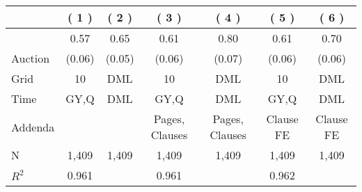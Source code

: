
\begin{tabular}{lcccccc}
\toprule
 & ( 1 ) & ( 2 ) & ( 3 ) & ( 4 ) & ( 5 ) & ( 6 )\\
\midrule
 & 0.57 & 0.65 & 0.61 & 0.80 & 0.61 & 0.70\\

\multirow{-2}{*}{\raggedright\arraybackslash Auction} & (0.06) & (0.05) & (0.06) & (0.07) & (0.06) & (0.06)\\

\midrule
Grid & 10 & DML & 10 & DML & 10 & DML\\

Time & GY,Q & DML & GY,Q & DML & GY,Q & DML\\

Addenda &  &  & Pages, Clauses & Pages, Clauses & Clause FE & Clause FE\\

N & 1,409 & 1,409 & 1,409 & 1,409 & 1,409 & 1,409\\

$R^2$ & 0.961 &  & 0.961 &  & 0.962 & \\
\bottomrule
\end{tabular}

